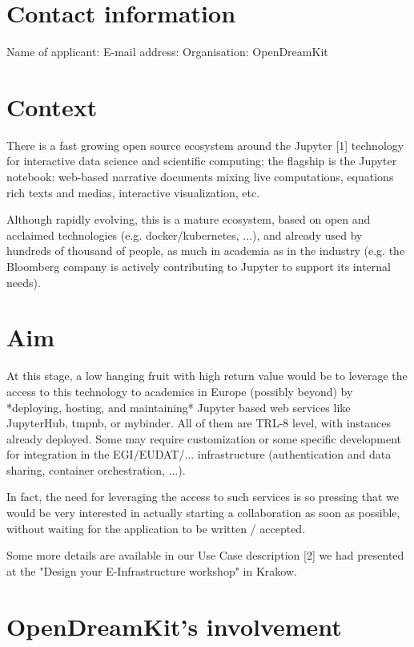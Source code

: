 \section{Contact information}

Name of applicant:
E-mail address:
Organisation: OpenDreamKit

\section{Context}

There is a fast growing open source ecosystem around the Jupyter [1]
technology for interactive data science and scientific computing; the
flagship is the Jupyter notebook: web-based narrative documents mixing
live computations, equations rich texts and medias, interactive
visualization, etc.

Although rapidly evolving, this is a mature ecosystem, based on open
and acclaimed technologies (e.g. docker/kubernetes, ...), and already
used by hundreds of thousand of people, as much in academia as in the
industry (e.g. the Bloomberg company is actively contributing to
Jupyter to support its internal needs).

\section{Aim}

At this stage, a low hanging fruit with high return value would be to
leverage the access to this technology to academics in Europe
(possibly beyond) by *deploying, hosting, and maintaining* Jupyter
based web services like JupyterHub, tmpnb, or mybinder. All of them
are TRL-8 level, with instances already deployed. Some may require
customization or some specific development for integration in the
EGI/EUDAT/... infrastructure (authentication and data sharing,
container orchestration, ...).

In fact, the need for leveraging the access to such services is so
pressing that we would be very interested in actually starting a
collaboration as soon as possible, without waiting for the application
to be written / accepted.

Some more details are available in our Use Case description [2] we had
presented at the "Design your E-Infrastructure workshop" in Krakow.

\section{OpenDreamKit's involvement}

